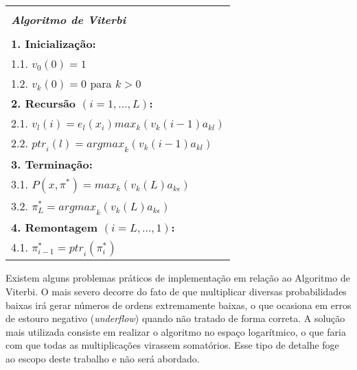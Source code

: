 \begin{center}
  \begin{spacing}{1.0}
    \begin{tabular}{l}
      \hline \\[-0.25cm]
      \hspace{1.2cm} {\large {\bf \emph{ Algoritmo de Viterbi } } } \hspace{1.2cm} \\[0.1cm]
      \hline \\[-0.25cm]
      \hspace{0.2cm} {\bf 1. Inicialização:} \\
      \hspace{0.9cm} 1.1. $ v_0(0) = 1 $ \\
      \hspace{0.9cm} 1.2. $ v_k(0) = 0 $ para $ k > 0 $ \\
      \hspace{0.2cm} {\bf 2. Recursão $ (i = 1, ..., L) $:} \\
      \hspace{0.9cm} 2.1. $ v_l(i) = e_l(x_i) {max}_k(v_k(i-1)a_{kl}) $ \\
      \hspace{0.9cm} 2.2. $ {ptr}_i(l) = {argmax}_k(v_k(i-1)a_{kl}) $ \\
      \hspace{0.2cm} {\bf 3. Terminação:} \\
      \hspace{0.9cm} 3.1. $ P(x,\pi^\ast) = {max}_k(v_k(L)a_{k\epsilon}) $ \\
      \hspace{0.9cm} 3.2. $ \pi_{L}^{\ast} = {argmax}_k(v_k(L)a_{k\epsilon}) $ \\
      \hspace{0.2cm} {\bf 4. Remontagem $ (i = L, ..., 1) $:} \\
      \hspace{0.9cm} 4.1. $ \pi_{i-1}^{\ast} = {ptr}_i(\pi_{i}^{\ast}) $ \\[0.1cm]
      \hline
    \end{tabular}
  \end{spacing}
\end{center}

Existem alguns problemas práticos de implementação em relação ao Algoritmo de Viterbi. O mais severo decorre do fato de que multiplicar diversas probabilidades baixas irá gerar números de ordens extremamente baixas, o que ocasiona em erros de estouro negativo (\emph{underflow}) quando não tratado de forma correta. A solução mais utilizada consiste em realizar o algoritmo no espaço logarítmico, o que faria com que todas as multiplicações virassem somatórios. Esse tipo de detalhe foge ao escopo deste trabalho e não será abordado.


